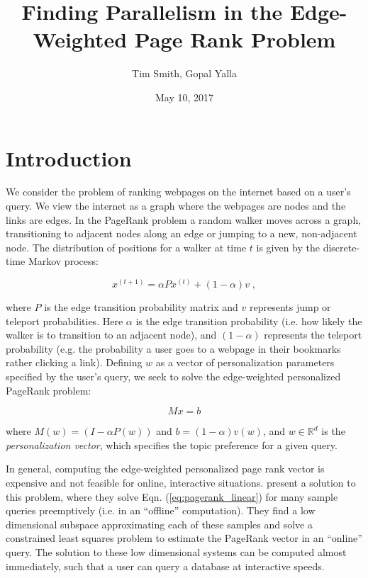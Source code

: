 \documentclass[11pt]{article}
\title{Finding Parallelism in the Edge-Weighted Page Rank Problem}
\author{Tim Smith, Gopal Yalla}
\date{May 10, 2017}
\newcommand{\noi}{\noindent}
\begin{document}
\maketitle
\thispagestyle{empty}

\newpage
\thispagestyle{empty}
\tableofcontents
\newpage
\setcounter{page}{1}


\section{Introduction}

We consider the problem of ranking webpages on the internet based on a user's
query. We view the internet as a graph where the webpages are nodes and the
links are edges. 
In the PageRank problem a random walker moves across a graph, transitioning to
adjacent nodes along an edge or jumping to a new, non-adjacent node. The
distribution of positions for a walker at time $t$ is given by the discrete-time
Markov process: 

\begin{equation}
        x^{(t+1)}=\alpha P x^{(t)} + (1-\alpha) v \; ,
\label{eq:pagerank_markov}
\end{equation}

\noi where $P$ is the edge transition probability matrix and $v$ represents jump or
teleport probabilities. Here $\alpha$ is the edge
transition probability (i.e. how likely the walker is to transition to an
adjacent node), and $(1-\alpha)$ represents the teleport probability (e.g. the
probability a user goes to a webpage in their bookmarks rather clicking a link).
Defining $w$ as a vector of personalization parameters specified by the user's
query, we seek to solve the
edge-weighted personalized PageRank problem: 

\begin{equation}
        Mx=b
\label{eq:pagerank_linear}
\end{equation}

\noi where $M(w) = (I-\alpha P(w))$ and $b = (1-\alpha)v(w)$, and $w \in
\mathbb{R}^d$ is
the \textit{personalization vector}, which specifies the topic preference for
a given query. 

In general, computing the edge-weighted personalized page rank vector is expensive
and not feasible for online, interactive situations. \cite{xie} present a
solution to this problem, where they solve Eqn. (\ref{eq:pagerank_linear}) for many
sample queries preemptively (i.e. in an ``offline'' computation). They find a low
dimensional subspace approximating each of these samples and solve a constrained least squares
problem to estimate the PageRank vector in an ``online'' query. The solution to
these low dimensional systems can be computed almost immediately, such that
a user can query a database at interactive speeds.   
\end{document}
